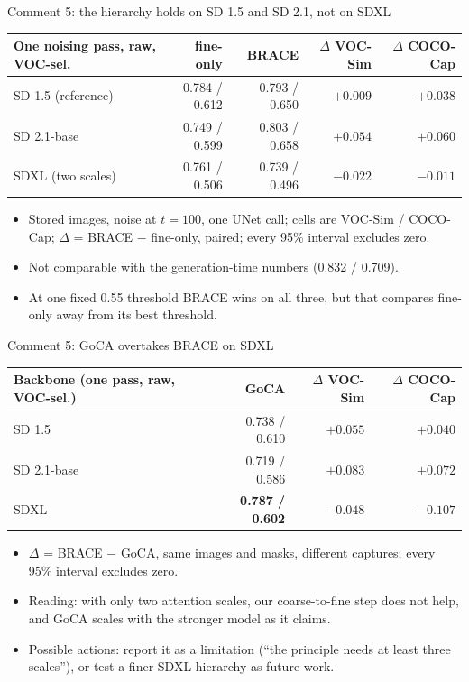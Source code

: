 \begin{frame}{Comment 5: the hierarchy holds on SD 1.5 and SD 2.1, not on SDXL}
\begin{slidetable}
\begin{tabular}{@{}lrrrr@{}}
\toprule
One noising pass, raw, VOC-sel. & fine-only & BRACE & $\Delta$ VOC-Sim & $\Delta$ COCO-Cap \\
\midrule
SD 1.5 (reference) & 0.784 / 0.612 & 0.793 / 0.650 & $+0.009$ & $\mathbf{+0.038}$ \\
SD 2.1-base & 0.749 / 0.599 & 0.803 / 0.658 & $\mathbf{+0.054}$ & $\mathbf{+0.060}$ \\
SDXL (two scales) & 0.761 / 0.506 & 0.739 / 0.496 & $\mathbf{-0.022}$ & $\mathbf{-0.011}$ \\
\bottomrule
\end{tabular}
\end{slidetable}
\begin{itemize}
\item Stored images, noise at $t=100$, one UNet call; cells are VOC-Sim / COCO-Cap; $\Delta$ = BRACE $-$ fine-only, paired; every 95\% interval excludes zero.
\item Not comparable with the generation-time numbers (0.832 / 0.709).
\item At one fixed 0.55 threshold BRACE wins on all three, but that compares fine-only away from its best threshold.
\end{itemize}
\end{frame}

\begin{frame}{Comment 5: GoCA overtakes BRACE on SDXL}
\begin{slidetable}
\begin{tabular}{@{}lrrr@{}}
\toprule
Backbone (one pass, raw, VOC-sel.) & GoCA & $\Delta$ VOC-Sim & $\Delta$ COCO-Cap \\
\midrule
SD 1.5 & 0.738 / 0.610 & $+0.055$ & $+0.040$ \\
SD 2.1-base & 0.719 / 0.586 & $+0.083$ & $+0.072$ \\
SDXL & \textbf{0.787 / 0.602} & $-0.048$ & $-0.107$ \\
\bottomrule
\end{tabular}
\end{slidetable}
\begin{itemize}
\item $\Delta$ = BRACE $-$ GoCA, same images and masks, different captures; every 95\% interval excludes zero.
\item Reading: with only two attention scales, our coarse-to-fine step does not help, and GoCA scales with the stronger model as it claims.
\item Possible actions: report it as a limitation (``the principle needs at least three scales''), or test a finer SDXL hierarchy as future work.
\end{itemize}
\end{frame}
